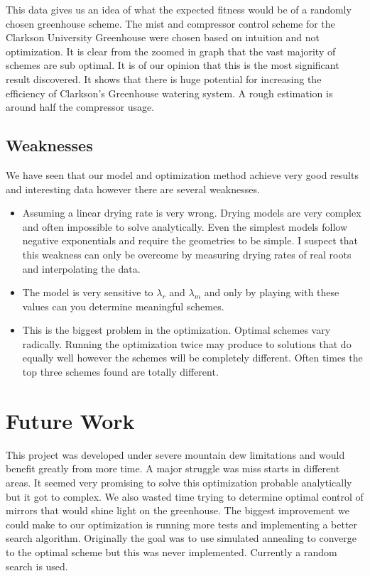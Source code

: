 \documentclass[a4paper,12pt]{article}
\begin{document}
This data gives us an idea of what the expected fitness would be of a randomly chosen greenhouse scheme. The mist and compressor control scheme for the Clarkson University Greenhouse were chosen based on intuition and not optimization. It is clear from the zoomed in graph that the vast majority of schemes are sub optimal. It is of our opinion that this is the most significant result discovered. It shows that there is huge potential for increasing the efficiency of Clarkson's Greenhouse watering system. A rough estimation is around half the compressor usage.

\subsection{Weaknesses}

We have seen that our model and optimization method achieve very good results and interesting data however there are several weaknesses.

\begin{itemize}
		  \item Assuming a linear drying rate is very wrong. Drying models are very complex and often impossible to solve analytically. Even the simplest models follow negative exponentials and require the geometries to be simple. I suspect that this weakness can only be overcome by measuring drying rates of real roots and interpolating the data. \cite{mujumdar2000fundamental}
		  \item The model is very sensitive to $\lambda_r$ and $\lambda_m$ and only by playing with these values can you determine meaningful schemes.
	     \item This is the biggest problem in the optimization. Optimal schemes vary radically. Running the optimization twice may produce to solutions that do equally well however the schemes will be completely different. Often times the top three schemes found are totally different.
\end{itemize}



\section{Future Work}

This project was developed under severe mountain dew limitations and would benefit greatly from more time. A major struggle was miss starts in different areas. It seemed very promising to solve this optimization probable analytically but it got to complex. We also wasted time trying to determine optimal control of mirrors that would shine light on the greenhouse. The biggest improvement we could make to our optimization is running more tests and implementing a better search algorithm. Originally the goal was to use simulated annealing to converge to the optimal scheme but this was never implemented. Currently a random search is used.  
\end{document}
